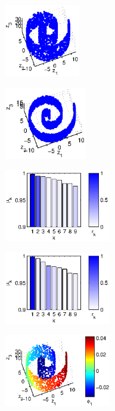 \documentclass[preprint]{elsarticle}
\begin{document}
\begin{figure}[!th]
%
\begin{subfigure}{0.45\textwidth}
\centering
\includegraphics[height=1.25in]{swissroll1}
\caption{}
\end{subfigure}
\hfill
\begin{subfigure}{0.45\textwidth}
\centering
\includegraphics[height=1.25in]{swissroll2}
\caption{}
\end{subfigure}
\hfill
\begin{subfigure}{0.45\textwidth}
\centering
\includegraphics[height=1.25in]{swissroll1_evals}
\caption{}
\end{subfigure}
\hfill
\begin{subfigure}{0.45\textwidth}
\centering
\includegraphics[height=1.25in]{swissroll2_evals}
\caption{}
\end{subfigure}
\hfill
\begin{subfigure}{0.45\textwidth}
\centering
\includegraphics[height=1.25in]{swissroll1_color1} 

\end{subfigure}
\end{figure}
\end{document}
